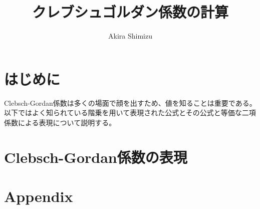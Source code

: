 \documentclass[dvipdfmx]{jsarticle}
\begin{document}
\title{クレブシュゴルダン係数の計算}
\author{Akira Shimizu}
\thispagestyle{empty}
\maketitle

\tableofcontents
\clearpage

\section{はじめに}

Clebsch-Gordan係数は多くの場面で顔を出すため、値を知ることは重要である。
以下ではよく知られている階乗を用いて表現された公式とその公式と等価な二項係数による表現について説明する。

\section{Clebsch-Gordan係数の表現}




\newpage
\section{Appendix}

\end{document}
